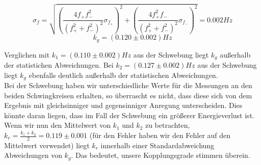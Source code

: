 \documentclass[twoside]{protokoll}
\begin{document}
\begin{equation}
    \sigma_f =\sqrt{\left(\frac{4f_+f_-^2}{\left(f_+^2+f_-^2\right)^2}\sigma_{f_+}\right)^2 + \left(\frac{4f_+^2f_-}{\left(f_+^2+f_-^2\right)^2}\sigma_{f_-}\right)^2}
    = 0.002 Hz
\end{equation}
\begin{equation}
    k_g = (0.120 \pm 0.002) Hz
\end{equation}

Verglichen mit $k_1 = (0.110 \pm 0.002) Hz$ aus der Schwebung liegt $k_g$ außerhalb der statistichen Abweichungen.
Bei $k_2 = (0.127 \pm 0.002) Hz$ aus der Schwebung liegt $k_g$ ebenfalls deutlich außerhalb der statistischen Abweichungen.\\
 
Bei der Schwebung haben wir unterschiedliche Werte für die Messungen an den beiden Schwingkreisen erhalten, so überrascht es nicht, dass diese sich von dem Ergebnis mit gleichsinniger und gegensinniger Anregung unterscheiden.
Dies könnte daran liegen, dass im Fall der Schwebung ein größerer Energieverlust ist. \\

Wenn wir nun den Mittelwert von $k_1$ und $k_2$ zu betrachten,
$k_r = \frac{k_1 + k_2}{2} = 0.119 \pm 0.001$ 
(für den Fehler haben wir den Fehler auf den Mittelwert verwendet)
liegt $k_r$ innerhalb einer Standardabweichung Abweichungen von $k_g$.
Das  bedeutet, unsere Kopplungsgrade stimmen überein.
\end{document}
